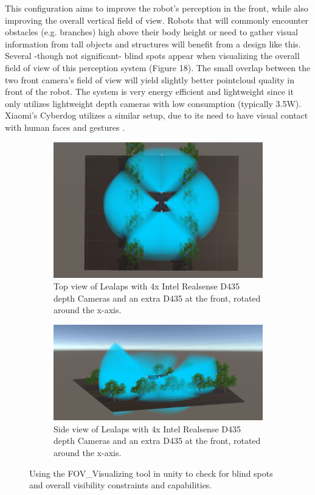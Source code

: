\documentclass{article}
\begin{document}
\begin{enumerate}
This configuration aims to improve the robot's perception in the front, while also improving the overall vertical field of view. Robots that will commonly encounter obstacles (e.g. branches) high above their body height or need to gather visual information from tall objects and structures will benefit from a design like this. Several -though not significant- blind spots appear when visualizing the overall field of view of this perception system (Figure 18). The small overlap between the two front camera's field of view will yield slightly better pointcloud quality in front of the robot. The system is very energy efficient and lightweight since it only utilizes lightweight depth cameras with low consumption (typically 3.5W).
Xiaomi's Cyberdog utilizes a similar setup, due to its need to have visual contact with human faces and gestures \cite{noauthor_xiaomi_nodate}.

\begin{figure}
\centering
\begin{subfigure}[htbp]{1\textwidth}
   \centering
   \includegraphics[width=0.8\linewidth]{FOV(27).png}
   \caption{Top view of Lealaps with 4x Intel Realsense D435 depth Cameras and an extra D435 at the front, rotated around the x-axis.}
\end{subfigure}
\begin{subfigure}[htbp]{1\textwidth}
   \centering
   \includegraphics[width=0.8\linewidth]{FOV(28).png}
   \caption{Side view of Lealaps with 4x Intel Realsense D435 depth Cameras and an extra D435 at the front, rotated around the x-axis.}
\end{subfigure}
\caption[]{Using the FOV\_Visualizing tool in unity to check for blind spots and overall visibility constraints and capabilities.}
\end{figure}


\end{enumerate}
\end{document}
